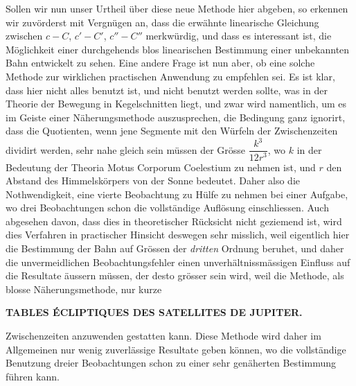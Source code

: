 Sollen wir nun unser Urtheil über diese neue Methode hier abgeben, so erkennen wir zuvörderst
mit Vergnügen an, dass die erwähnte linearische Gleichung zwischen $c-C$, $c'-C'$, $c''-C''$ merkwürdig, und dass es interessant ist, die Möglichkeit einer durchgehends blos linearischen Bestimmung einer unbekannten Bahn entwickelt zu sehen. Eine andere Frage ist nun aber, ob eine solche Methode
zur wirklichen practischen Anwendung zu empfehlen sei. Es ist klar, dass hier nicht alles benutzt ist,
und nicht benutzt werden sollte, was in der Theorie der Bewegung in Kegelschnitten liegt, und zwar
wird namentlich, um es im Geiste einer Näherungsmethode auszusprechen, die Bedingung ganz ignorirt, dass die Quotienten, wenn jene Segmente mit den Würfeln der Zwischenzeiten dividirt werden,
sehr nahe gleich sein müssen der Grösse $\dfrac{k^3}{12r^3}$, wo $k$ in der Bedeutung der Theoria Motus Corporum
Coelestium zu nehmen ist, und $r$ den Abstand des Himmelskörpers von der Sonne bedeutet. Daher
also die Nothwendigkeit, eine vierte Beobachtung zu Hülfe zu nehmen bei einer Aufgabe, wo drei
Beobachtungen schon die vollständige Auflösung einschliessen. Auch abgesehen davon, dass dies in
theoretischer Rücksicht nicht geziemend ist, wird dies Verfahren in practischer Hinsicht deswegen sehr
misslich, weil eigentlich hier die Bestimmung der Bahn auf Grössen der \emph{dritten} Ordnung beruhet, und
daher die unvermeidlichen Beobachtungsfehler einen unverhältnissmässigen Einfluss auf die Resultate
äussern müssen, der desto grösser sein wird, weil die Methode, als blosse Näherungsmethode, nur kurze\par
\clearpage
\thispagestyle{empty}
\noindent{}%
\makebox[12mm][l]{}%
\parbox[t]{\dimexpr\linewidth-24mm\relax}{\centering\footnotesize\bfseries TABLES ÉCLIPTIQUES DES SATELLITES DE JUPITER.\par}%
\par\medskip
\noindent Zwischenzeiten anzuwenden gestatten kann. Diese Methode wird daher im Allgemeinen nur wenig zuverlässige Resultate geben können, wo die vollständige Benutzung dreier Beobachtungen schon zu einer sehr genäherten Bestimmung führen kann.

